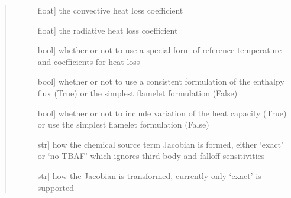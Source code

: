 \documentclass[letterpaper,10pt,english]{sphinxmanual}
\begin{document}
\begin{fulllineitems}
\begin{quote}
\begin{description}
\begin{description}
\item[{}] \leavevmode{[}float{]}
the convective heat loss coefficient

\item[{}] \leavevmode{[}float{]}
the radiative heat loss coefficient

\item[{}] \leavevmode{[}bool{]}
whether or not to use a special form of reference temperature and coefficients for heat loss

\item[{}] \leavevmode{[}bool{]}
whether or not to use a consistent formulation of the enthalpy flux (True) or the simplest flamelet formulation (False)

\item[{}] \leavevmode{[}bool{]}
whether or not to include variation of the heat capacity (True) or use the simplest flamelet formulation (False)

\item[{}] \leavevmode{[}str{]}
how the chemical source term Jacobian is formed, either ‘exact’ or ‘no-TBAF’ which ignores third-body and falloff sensitivities

\item[{}] \leavevmode{[}str{]}
how the Jacobian is transformed, currently only ‘exact’ is supported

\end{description}

\end{description}\end{quote}

\begin{fulllineitems}
\label{\detokenize{spitfire.chemistry.flamelet:spitfire.chemistry.flamelet.Flamelet.check_ignition_delay}}~
\end{fulllineitems}



\end{fulllineitems}
\end{document}
